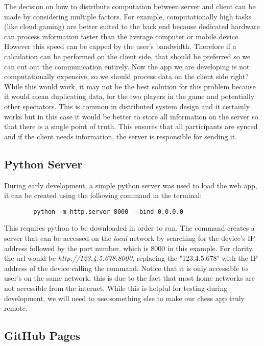 The decision on how to distribute computation between server and client can be made by considering multiple factors. For example, computationally high tasks (like cloud gaming) are better suited to the back end because dedicated hardware can process information faster than the average computer or mobile device. However this speed can be capped by the user's bandwidth. Therefore if a calculation can be performed on the client side, that should be preferred so we can cut out the communication entirely. Now the app we are developing is not computationally expensive, so we should process data on the client side right? While this would work, it may not be the best solution for this problem because it would mean duplicating data, for the two players in the game and potentially other spectators. This is common in distributed system design and it certainly works but in this case it would be better to store all information on the server so that there is a single point of truth. This ensures that all participants are synced and if the client needs information, the server is responsible for sending it.

\subsection{Python Server}
\label{PythonServer}

During early development, a simple python server was used to load the web app, it can be created using the following command in the terminal:
\begin{center}
    \begin{lstlisting}
        python -m http.server 8000 --bind 0.0.0.0
    \end{lstlisting}
\end{center}
This requires python to be downloaded in order to run. The command creates a server that can be accessed on the \emph{local} network by searching for the device's IP address followed by the port number, which is 8000 in this example. For clarity, the url would be \emph{http://123.4.5.678:8000}, replacing the "123.4.5.678" with the IP address of the device calling the command. Notice that it is only accessible to user's on the same network, this is due to the fact that most home networks are not accessible from the internet. While this is helpful for testing during development, we will need to use something else to make our chess app truly remote.

\subsection{GitHub Pages}
\label{GitHubPages}

